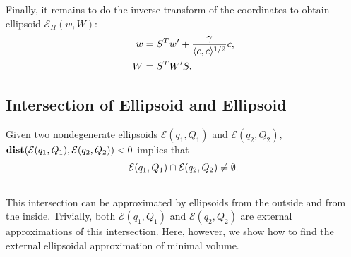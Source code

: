 \documentclass[letterpaper,10pt,english]{sphinxmanual}
\begin{document}
Finally, it remains to do the inverse transform of the coordinates to
obtain ellipsoid ${\mathcal E}_H(w,W)$:
\begin{gather}
\begin{split}\begin{aligned}
w & = S^Tw' + \frac{\gamma}{\langle c,c\rangle^{1/2}}c, \\
W & = S^TW'S.\end{aligned}\end{split}\notag
\end{gather}

\subsection{Intersection of Ellipsoid and Ellipsoid}
\label{chap_ellcalc:intersection-of-ellipsoid-and-ellipsoid}
Given two nondegenerate ellipsoids ${\mathcal E}(q_1,Q_1)$ and
${\mathcal E}(q_2,Q_2)$,
${\bf dist}({\mathcal E}(q_1,Q_1),{\mathcal E}(q_2,Q_2))<0$
implies that
\begin{gather}
\begin{split}{\mathcal E}(q_1,Q_1)\cap{\mathcal E}(q_2,Q_2)\neq\emptyset .\end{split}\notag\\\begin{split}\end{split}\notag
\end{gather}
This intersection can be approximated by ellipsoids from the outside
and from the inside. Trivially, both ${\mathcal E}(q_1,Q_1)$ and
${\mathcal E}(q_2,Q_2)$ are external approximations of this
intersection. Here, however, we show how to find the external
ellipsoidal approximation of minimal volume.
\end{document}

